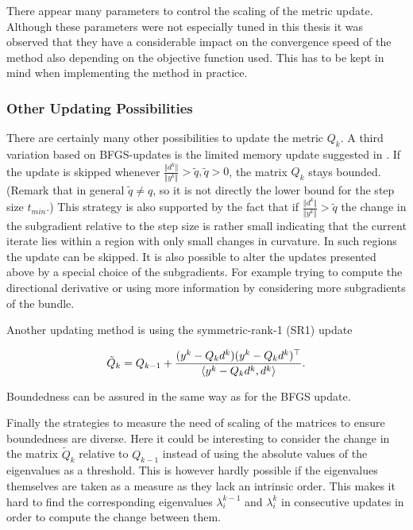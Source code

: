 
\begin{remark}
	There appear many parameters to control the scaling of the metric update. Although these parameters were not especially tuned in this thesis it was observed that they have a considerable impact on the convergence speed of the method also depending on the objective function used. This has to be kept in mind when implementing the method in practice.
\end{remark}

\subsubsection{Other Updating Possibilities}

There are certainly many other possibilities to update the metric \(Q_k\). A third variation based on BFGS-updates is the limited memory update suggested in \cite{Nocedal1980}. If the update is skipped whenever \(\frac{\Vert d^k\Vert}{\Vert y^k\Vert}> \tilde{q}, \tilde{q}>0\), the matrix \(Q_k\) stays bounded. (Remark that in general \(\tilde{q}\neq q\), so it is not directly the lower bound for the step size \(t_{min}\).) This strategy is also supported by the fact that if \(\frac{\Vert d^k\Vert}{\Vert y^k\Vert}> \tilde{q}\) the change in the subgradient relative to the step size
is rather small indicating that the current iterate lies within a region with only small changes in curvature. In such regions the update can be skipped.
It is also possible to alter the updates presented above by a special choice of the subgradients. For example trying to compute the directional derivative or using more information by considering more subgradients of the bundle.
 
Another updating method is using the symmetric-rank-1 (SR1) update

\[ \tilde{Q}_k = Q_{k-1}+\frac{(y^k-Q_kd^k)(y^k-Q_kd^k)^{\top}}{\left\langle y^k-Q_kd^k,d^k \right\rangle}. \]

Boundedness can be assured in the same way as for the BFGS update.

Finally the strategies to measure the need of scaling of the matrices to ensure boundedness are diverse. Here it could be interesting to consider the change in the matrix \(\tilde{Q}_k\) relative to \(Q_{k-1}\) instead of using the absolute values of the eigenvalues as a threshold.
This is however hardly possible if the eigenvalues themselves are taken as a measure as they lack an intrinsic order. This makes it hard to find the corresponding eigenvalues \(\lambda^{k-1}_i\) and \(\lambda^k_i\) in consecutive updates in order to compute the change between them.

